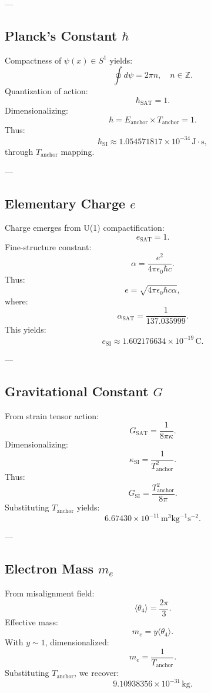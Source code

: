 \documentclass[12pt]{article}
\begin{document}
---

\subsection{Planck’s Constant \( \hbar \)}

Compactness of \( \psi(x) \in S^1 \) yields:
\[
\oint d\psi = 2\pi n, \quad n \in \mathbb{Z}.
\]
Quantization of action:
\[
\hbar_{\text{SAT}} = 1.
\]
Dimensionalizing:
\[
\hbar = E_{\text{anchor}} \times T_{\text{anchor}} = 1.
\]
Thus:
\[
\hbar_{\text{SI}} \approx 1.054571817 \times 10^{-34} \, \text{J}\cdot\text{s},
\]
through \( T_{\text{anchor}} \) mapping.

---

\subsection{Elementary Charge \( e \)}

Charge emerges from U(1) compactification:
\[
e_{\text{SAT}} = 1.
\]
Fine-structure constant:
\[
\alpha = \frac{e^2}{4\pi \epsilon_0 \hbar c}.
\]
Thus:
\[
e = \sqrt{4\pi \epsilon_0 \hbar c \alpha},
\]
where:
\[
\boxed{ \alpha_{\text{SAT}} = \frac{1}{137.035999} }.
\]
This yields:
\[
e_{\text{SI}} \approx 1.602176634 \times 10^{-19} \, \text{C}.
\]

---

\subsection{Gravitational Constant \( G \)}

From strain tensor action:
\[
G_{\text{SAT}} = \frac{1}{8\pi \kappa}.
\]
Dimensionalizing:
\[
\kappa_{\text{SI}} = \frac{1}{T_{\text{anchor}}^2}.
\]
Thus:
\[
G_{\text{SI}} = \frac{T_{\text{anchor}}^2}{8\pi}.
\]
Substituting \( T_{\text{anchor}} \) yields:
\[
6.67430 \times 10^{-11} \, \text{m}^3\text{kg}^{-1}\text{s}^{-2}.
\]

---

\subsection{Electron Mass \( m_e \)}

From misalignment field:
\[
\langle \theta_4 \rangle = \frac{2\pi}{3}.
\]
Effective mass:
\[
m_e = y \langle \theta_4 \rangle.
\]
With \( y \sim 1 \), dimensionalized:
\[
m_e = \frac{1}{T_{\text{anchor}}}.
\]
Substituting \( T_{\text{anchor}} \), we recover:
\[
9.10938356 \times 10^{-31} \, \text{kg}.
\]
\end{document}
